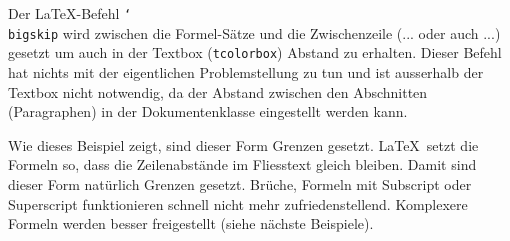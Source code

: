 
Der \LaTeX-Befehl \texttt{\char`\\bigskip} wird zwischen die Formel-Sätze und die Zwischenzeile (... oder auch ...) gesetzt um auch in der Textbox (\texttt{tcolorbox}) Abstand zu erhalten. Dieser Befehl hat nichts mit der eigentlichen  Problemstellung zu tun und ist ausserhalb der Textbox nicht notwendig, da der Abstand zwischen den Abschnitten (Paragraphen) in der Dokumentenklasse eingestellt werden kann.

Wie dieses Beispiel zeigt, sind dieser Form Grenzen gesetzt. \LaTeX\ setzt die Formeln so, dass die Zeilenabstände im Fliesstext gleich bleiben. Damit sind dieser Form natürlich Grenzen gesetzt. Brüche, Formeln mit Subscript oder Superscript funktionieren schnell nicht mehr zufriedenstellend. Komplexere Formeln werden besser freigestellt (siehe nächste Beispiele). 
